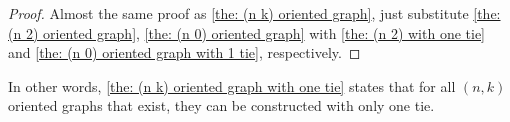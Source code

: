 \begin{proof}
  Almost the same proof as \cref{the: (n k) oriented graph},
  just substitute \cref{the: (n 2) oriented graph},
  \cref{the: (n 0) oriented graph} with
  \cref{the: (n 2) with one tie}
  and \cref{the: (n 0) oriented graph with 1 tie},
  respectively.
\end{proof}

In other words,
\cref{the: (n k) oriented graph with one tie}
states that for all \((n, k)\) oriented graphs that exist,
they can be constructed with only one tie.
